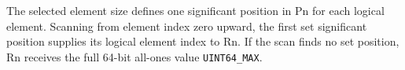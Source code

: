 The selected element size defines one significant position in Pn for each
logical element.  Scanning from element index zero upward, the first set
significant position supplies its logical element index to Rn.  If the scan
finds no set position, Rn receives the full 64-bit all-ones value
\texttt{UINT64\_MAX}.
